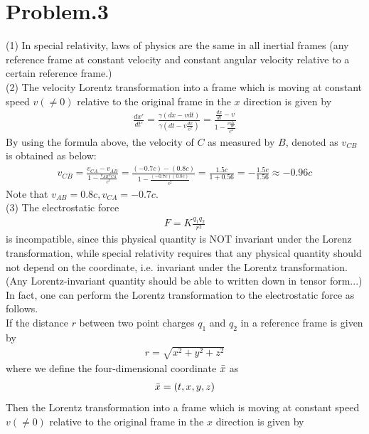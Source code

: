 \documentclass[12pt]{article}
\begin{document}
\section*{Problem.3}
(1) In special relativity, laws of physics are the same in all inertial frames (any reference frame at constant velocity and constant angular velocity relative to a certain reference frame.)
\\
(2) The velocity Lorentz transformation into a frame which is moving at constant speed $v (\neq 0)$ relative to the original frame in the $x$ direction is given by
\begin{gather*}
\frac{d x'}{d t'} = \frac{\gamma \left(d x - v dt\right)}{\gamma \left(d t - v \frac{dx}{c^2}\right)} = \frac{\frac{d x}{d t} - v}{1 - \frac{v \frac{d x}{d t} }{c^2}}
\end{gather*}
By using the formula above, the velocity of $C$ as measured by $B$, denoted as $v_{CB}$ is obtained as below:
\begin{gather*}
v_{CB} = \frac{v_{CA} - v_{AB}}{1 - \frac{v_{AB} v_{CA} }{c^2}} = \frac{(-0.7c) - (0.8c)}{1 - \frac{(-0.7c) (0.8c) }{c^2}} = \frac{1.5c}{1 + 0.56} = -\frac{1.5c}{1.56} \approx -0.96 c 
\end{gather*}
Note that $v_{AB} = 0.8c, v_{CA} = -0.7c$.
\\
(3)
The electrostatic force 
\begin{gather*}
F = K \frac{q_1 q_2}{r^2}
\end{gather*}
is incompatible, since this physical quantity is NOT invariant under the Lorenz transformation, while special relativity requires that any physical quantity should not depend on the coordinate, i.e. invariant under the Lorentz transformation. (Any Lorentz-invariant quantity should be able to written down in tensor form...)
\\[1em]
In fact, one can perform the Lorentz transformation to the electrostatic force as follows.\\
If the distance $r$ between two point charges $q_1$ and $q_2$ in a reference frame is given by
\begin{gather*}
r = \sqrt{x^2 + y^2 + z^2}
\end{gather*}
where we define the four-dimensional coordinate $\Bar{x}$ as
\begin{gather*}
\Bar{x} = \left(t, x, y, z \right)
\end{gather*}
Then the Lorentz transformation into a frame which is moving at constant speed $v (\neq 0)$ relative to the original frame in the $x$ direction is given by
\end{document}

